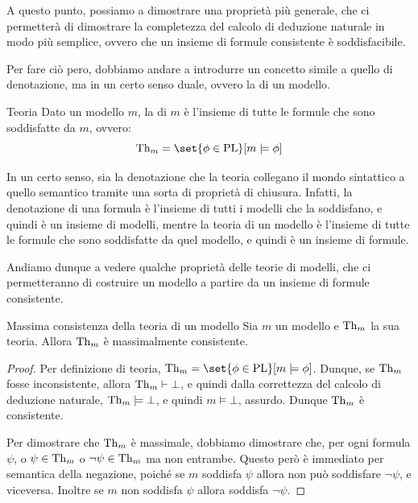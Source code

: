 A questo punto, possiamo a dimostrare una proprietà più generale, che ci permetterà di dimostrare la completezza del calcolo di deduzione naturale in modo più semplice, ovvero che un insieme di formule consistente è soddisfacibile.

Per fare ciò pero, dobbiamo andare a introdurre un concetto simile a quello di denotazione, ma in un certo senso duale, ovvero la  di un modello.

\begin{definition}{Teoria}
  Dato un modello \(m\), la  di \(m\) è l'insieme di tutte le formule che sono soddisfatte da \(m\), ovvero:
  \[\Th{m} = \set{\phi \in \PL }[ m \models \phi]\]
\end{definition}

In un certo senso, sia la denotazione che la teoria collegano il mondo sintattico a quello semantico tramite una sorta di proprietà di chiusura. Infatti, la denotazione di una formula è l'insieme di tutti i modelli che la soddisfano, e quindi è un insieme di modelli, mentre la teoria di un modello è l'insieme di tutte le formule che sono soddisfatte da quel modello, e quindi è un insieme di formule.

Andiamo dunque a vedere qualche proprietà delle teorie di modelli, che ci permetteranno di costruire un modello a partire da un insieme di formule consistente.

\begin{proposition}{Massima consistenza della teoria di un modello}
  Sia \(m\) un modello e \(\operatorname{Th}_{m}\) la sua teoria. Allora \(\operatorname{Th}_{m}\) è massimalmente consistente.
\end{proposition}

\begin{proof}
  Per definizione di teoria, \(\Th{m} = \set{\phi\in\PL}[m\models\phi]\). Dunque, se \(\operatorname{Th}_{m}\) fosse inconsistente, allora \(\operatorname{Th}_{m}\vdash\bot\), e quindi dalla correttezza del calcolo di deduzione naturale, \(\operatorname{Th}_{m}\models\bot\), e quindi \(m\models\bot\), assurdo. Dunque \(\operatorname{Th}_{m}\) è consistente.

  Per dimostrare che \(\operatorname{Th}_{m}\) è massimale, dobbiamo dimostrare che, per ogni formula \(\psi\), o \(\psi\in\operatorname{Th}_{m}\) o \(\neg\psi\in\operatorname{Th}_{m}\) ma non entrambe. Questo però è immediato per semantica della negazione, poiché se \(m\) soddisfa \(\psi\) allora non può soddisfare \(\neg\psi\), e viceversa. Inoltre se \(m\) non soddisfa \(\psi\) allora soddisfa \(\neg\psi\).
\end{proof}

